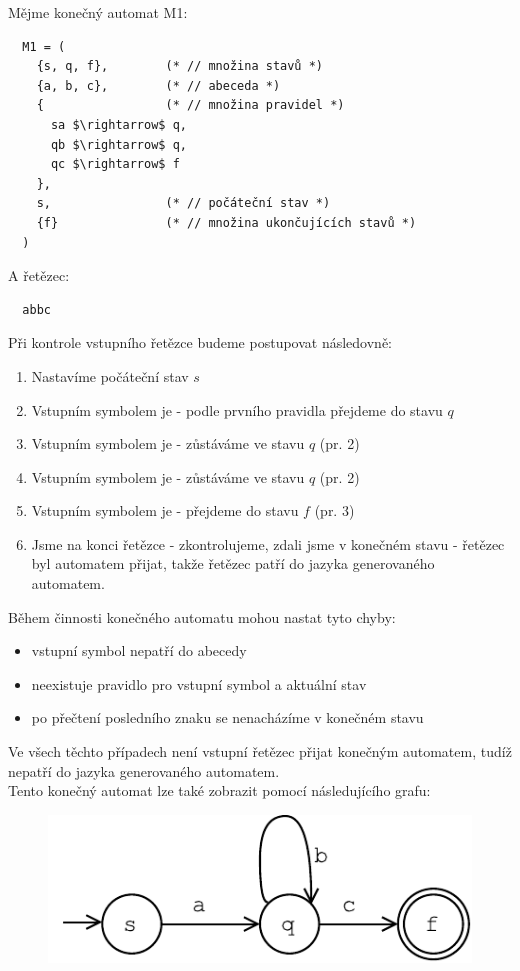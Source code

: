 \begin{exmp}
  Mějme konečný automat M1:
  \begin{lstlisting}
  M1 = (
    {s, q, f},        (* // množina stavů *)
    {a, b, c},        (* // abeceda *)
    {                 (* // množina pravidel *)
      sa $\rightarrow$ q,
      qb $\rightarrow$ q,
      qc $\rightarrow$ f
    },
    s,                (* // počáteční stav *)
    {f}               (* // množina ukončujících stavů *)
  )
  \end{lstlisting}
  A řetězec:
\begin{lstlisting}
  abbc
\end{lstlisting}

\noindent
Při kontrole vstupního řetězce budeme postupovat následovně:

\begin{enumerate}
  \item Nastavíme počáteční stav $s$
  \item Vstupním symbolem je  - podle prvního pravidla přejdeme do stavu $q$
  \item Vstupním symbolem je  - zůstáváme ve stavu $q$ (pr. 2)
  \item Vstupním symbolem je  - zůstáváme ve stavu $q$ (pr. 2)
  \item Vstupním symbolem je  - přejdeme do stavu $f$ (pr. 3)
  \item Jsme na konci řetězce - zkontrolujeme, zdali jsme v konečném stavu - řetězec byl automatem přijat,
  takže řetězec patří do jazyka generovaného automatem.
\end{enumerate}

\noindent
Během činnosti konečného automatu mohou nastat tyto chyby:

\begin{itemize}
  \item vstupní symbol nepatří do abecedy
  \item neexistuje pravidlo pro vstupní symbol a aktuální stav
  \item po přečtení posledního znaku se nenacházíme v konečném stavu
\end{itemize}
Ve všech těchto případech není vstupní řetězec přijat konečným automatem, tudíž nepatří
do jazyka generovaného automatem.\\

\noindent
Tento konečný automat lze také zobrazit pomocí následujícího grafu:

\begin{figure}[H]
  \centering
  \includegraphics{fig/finiteAutomat.pdf}
\end{figure}

\end{exmp}

